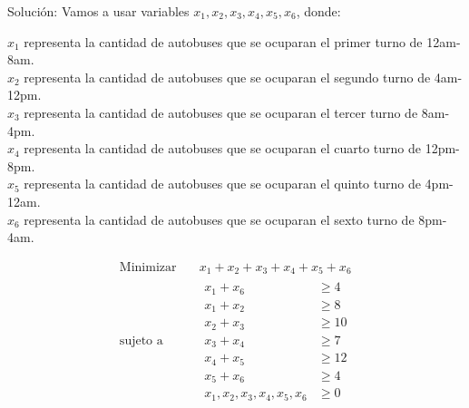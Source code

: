 \documentclass[twocolumn]{article}
\begin{document}
Solución: Vamos a usar variables
$x_{1},x_{2},x_{3},x_{4},x_{5},x_{6}$, donde:
\begin{center}
  $x_{1}$ representa la cantidad de autobuses que se ocuparan el
  primer turno de 12am-8am.\\
  $x_{2}$ representa la cantidad de autobuses que se ocuparan el
  segundo turno de 4am-12pm.\\
  $x_{3}$ representa la cantidad de autobuses que se ocuparan el
  tercer turno de 8am-4pm.\\
  $x_{4}$ representa la cantidad de autobuses que se ocuparan el
  cuarto turno de 12pm-8pm.\\
  $x_{5}$ representa la cantidad de autobuses que se ocuparan el
  quinto turno de 4pm-12am.\\
  $x_{6}$ representa la cantidad de autobuses que se ocuparan el sexto turno de 8pm-4am.\\
\end{center}
\begin{equation*}
 \begin{aligned}
\text{Minimizar} \quad & x_{1}+x_{2}+x_{3}+x_{4}+x_{5}+x_{6}\\
\text{sujeto a} \quad &
  \begin{aligned}
   x_{1}+x_{6} &\geq 4\\
   x_{1}+x_{2} &\geq 8\\
   x_{2}+x_{3} &\geq 10\\
   x_{3}+x_{4} &\geq 7\\
   x_{4}+x_{5} &\geq 12\\
   x_{5}+x_{6} &\geq 4\\
    x_{1},x_{2},x_{3},x_{4},x_{5},x_{6} &\geq 0
  \end{aligned}
\end{aligned}
\end{equation*}
\end{document}
